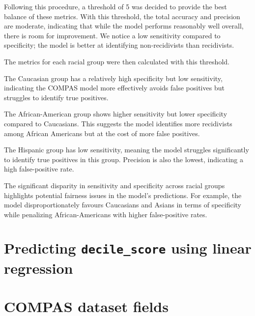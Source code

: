 \documentclass[conference]{IEEEtran}
\begin{document}
	Following this procedure, a threshold of 5 was decided to provide the best balance of these metrics. With this threshold, the total accuracy and precision are moderate, indicating that while the model performs reasonably well overall, there is room for improvement. We notice a low sensitivity compared to specificity; the model is better at identifying non-recidivists than recidivists.
	
	
	The metrics for each racial group were then calculated with this threshold.
	
	
	The Caucasian group has a relatively high specificity but low sensitivity, indicating the COMPAS model more effectively avoids false positives but struggles to identify true positives. 
	
	The African-American group shows higher sensitivity but lower specificity compared to Caucasians. This suggests the model identifies more recidivists among African Americans but at the cost of more false positives.
	
	
	The Hispanic group has low sensitivity, meaning the model struggles significantly to identify true positives in this group. Precision is also the lowest, indicating a high false-positive rate.
	
	
	The significant disparity in sensitivity and specificity across racial groups highlights potential fairness issues in the model's predictions. For example, the model disproportionately favours Caucasians and Asians in terms of specificity while penalizing African-Americans with higher false-positive rates.
	
	\section{Predicting \textbf{\texttt{decile\_score}} using linear regression}
	
	
\printbibliography

\onecolumn
\pagebreak
\appendix 
\section{COMPAS dataset fields}
\end{document}
